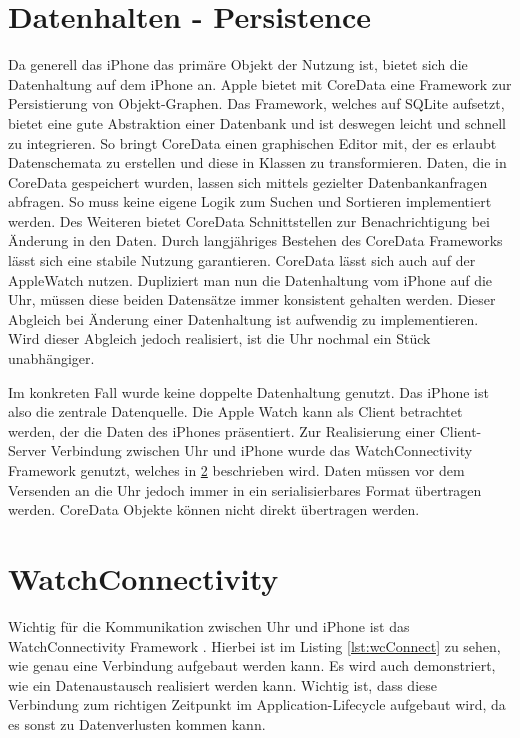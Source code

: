 \section{Datenhalten - Persistence}
Da generell das iPhone das primäre Objekt der Nutzung ist, bietet sich die Datenhaltung auf dem iPhone an. Apple bietet mit CoreData \cite{Apple:2015swiftOpen} eine Framework zur Persistierung von Objekt-Graphen. Das Framework, welches auf SQLite aufsetzt, bietet eine gute Abstraktion einer Datenbank und ist deswegen leicht und schnell zu integrieren. So bringt CoreData einen graphischen Editor mit, der es erlaubt Datenschemata zu erstellen und diese in Klassen zu transformieren. Daten, die in CoreData gespeichert wurden, lassen sich mittels gezielter Datenbankanfragen abfragen. So muss keine eigene Logik zum Suchen und Sortieren implementiert werden. Des Weiteren bietet CoreData Schnittstellen zur Benachrichtigung bei Änderung in den Daten. Durch langjähriges Bestehen des CoreData Frameworks lässt sich eine stabile Nutzung garantieren. CoreData lässt sich auch auf der AppleWatch nutzen. Dupliziert man nun die Datenhaltung vom iPhone auf die Uhr, müssen diese beiden Datensätze immer konsistent gehalten werden. Dieser Abgleich bei Änderung einer Datenhaltung ist aufwendig zu implementieren. Wird dieser Abgleich jedoch realisiert, ist die Uhr nochmal ein Stück unabhängiger. 

Im konkreten Fall wurde keine doppelte Datenhaltung genutzt. Das iPhone ist also die zentrale Datenquelle. Die Apple Watch kann als Client betrachtet werden, der die Daten des iPhones präsentiert. Zur Realisierung einer Client-Server Verbindung zwischen Uhr und iPhone wurde das WatchConnectivity Framework genutzt, welches in \ref{watchCon} beschrieben wird. Daten müssen vor dem Versenden an die Uhr jedoch immer in ein serialisierbares Format übertragen werden. CoreData Objekte  können nicht direkt übertragen werden.


\section{WatchConnectivity}
\label{watchCon}
Wichtig für die Kommunikation zwischen Uhr und iPhone ist das WatchConnectivity Framework \cite{Apple:2015SharingDataToWatch}. Hierbei ist im Listing \ref{lst:wcConnect} zu sehen, wie genau eine Verbindung aufgebaut werden kann. Es wird auch demonstriert, wie ein Datenaustausch realisiert werden kann. Wichtig ist, dass diese Verbindung zum richtigen Zeitpunkt im Application-Lifecycle aufgebaut wird, da es sonst zu Datenverlusten kommen kann.

